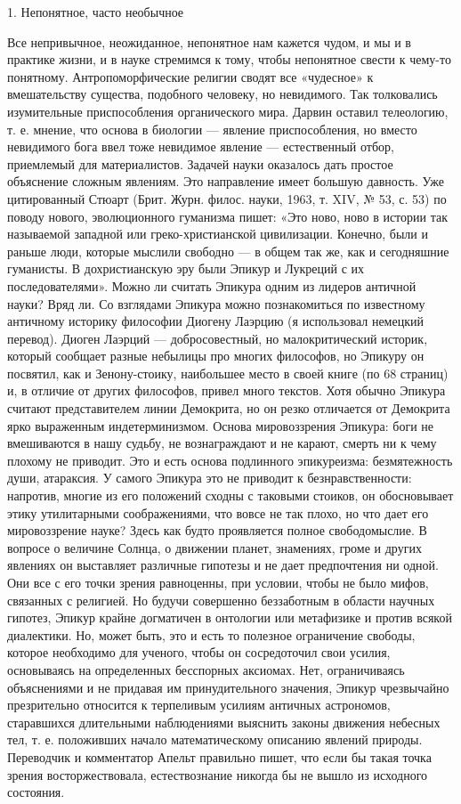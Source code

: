1. Непонятное, часто необычное

Все непривычное, неожиданное, непонятное нам кажется чудом, и мы и в практике
жизни, и в науке стремимся к тому, чтобы непонятное свести к чему-то понятному.
Антропоморфические религии сводят все «чудесное» к вмешательству существа,
подобного человеку, но невидимого. Так толковались изумительные приспособления
органического мира. Дарвин оставил телеологию, т. е. мнение, что основа в
биологии --- явление приспособления, но вместо невидимого бога ввел тоже
невидимое явление --- естественный отбор, приемлемый для материалистов. Задачей
науки оказалось дать простое объяснение сложным явлениям. Это направление имеет
большую давность. Уже цитированный Стюарт (Брит. Журн. филос. науки, 1963, т.
XIV, № 53, с. 53) по поводу нового, эволюционного гуманизма пишет: «Это ново,
ново в истории так называемой западной или греко-христианской цивилизации.
Конечно, были и раньше люди, которые мыслили свободно --- в общем так же, как и
сегодняшние гуманисты. В дохристианскую эру были Эпикур и Лукреций с их
последователями». Можно ли считать Эпикура одним из лидеров античной науки?
Вряд ли. Со взглядами Эпикура можно познакомиться по известному античному
историку философии Диогену Лаэрцию (я использовал немецкий перевод). Диоген
Лаэрций --- добросовестный, но малокритический историк, который сообщает разные
небылицы про многих философов, но Эпикуру он посвятил, как и Зенону-стоику,
наибольшее место в своей книге (по 68 страниц) и, в отличие от других
философов, привел много текстов. Хотя обычно Эпикура считают представителем
линии Демокрита, но он резко отличается от Демокрита ярко выраженным
индетерминизмом. Основа мировоззрения Эпикура: боги не вмешиваются в нашу
судьбу, не вознаграждают и не карают, смерть ни к чему плохому не приводит. Это
и есть основа подлинного эпикуреизма: безмятежность души, атараксия. У самого
Эпикура это не приводит к безнравственности: напротив, многие из его положений
сходны с таковыми стоиков, он обосновывает этику утилитарными соображениями,
что вовсе не так плохо, но что дает его мировоззрение науке? Здесь как будто
проявляется полное свободомыслие. В вопросе о величине Солнца, о движении
планет, знамениях, громе и других явлениях он выставляет различные гипотезы и
не дает предпочтения ни одной. Они все с его точки зрения равноценны, при
условии, чтобы не было мифов, связанных с религией. Но будучи совершенно
беззаботным в области научных гипотез, Эпикур крайне догматичен в онтологии или
метафизике и против всякой диалектики. Но, может быть, это и есть то полезное
ограничение свободы, которое необходимо для ученого, чтобы он сосредоточил свои
усилия, основываясь на определенных бесспорных аксиомах. Нет, ограничиваясь
объяснениями и не придавая им принудительного значения, Эпикур чрезвычайно
презрительно относится к терпеливым усилиям античных астрономов, старавшихся
длительными наблюдениями выяснить законы движения небесных тел, т. е.
положивших начало математическому описанию явлений природы. Переводчик и
комментатор Апельт правильно пишет, что если бы такая точка зрения
восторжествовала, естествознание никогда бы не вышло из исходного состояния.

